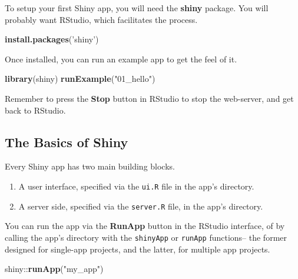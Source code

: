 \documentclass[]{book}
\newenvironment{Shaded}{\begin{snugshade}}{\end{snugshade}}
\newcommand{\KeywordTok}[1]{\textcolor[rgb]{0.13,0.29,0.53}{\textbf{{#1}}}}
\newcommand{\StringTok}[1]{\textcolor[rgb]{0.31,0.60,0.02}{{#1}}}
\newcommand{\NormalTok}[1]{{#1}}
\providecommand{\tightlist}{%
  \setlength{\itemsep}{0pt}\setlength{\parskip}{0pt}}
\theoremstyle{definition}
\theoremstyle{definition}
\theoremstyle{remark}
\begin{document}
To setup your first Shiny app, you will need the \textbf{shiny} package.
You will probably want RStudio, which facilitates the process.

\begin{Shaded}
\begin{Highlighting}[]
\KeywordTok{install.packages}\NormalTok{(}\StringTok{'shiny'}\NormalTok{)}
\end{Highlighting}
\end{Shaded}

Once installed, you can run an example app to get the feel of it.

\begin{Shaded}
\begin{Highlighting}[]
\KeywordTok{library}\NormalTok{(shiny)}
\KeywordTok{runExample}\NormalTok{(}\StringTok{"01_hello"}\NormalTok{)}
\end{Highlighting}
\end{Shaded}

Remember to press the \textbf{Stop} button in RStudio to stop the
web-server, and get back to RStudio.

\subsection{The Basics of Shiny}\label{the-basics-of-shiny}

Every Shiny app has two main building blocks.

\begin{enumerate}
\def\labelenumi{\arabic{enumi}.}
\tightlist
\item
  A user interface, specified via the \texttt{ui.R} file in the app's
  directory.
\item
  A server side, specified via the \texttt{server.R} file, in the app's
  directory.
\end{enumerate}

You can run the app via the \textbf{RunApp} button in the RStudio
interface, of by calling the app's directory with the \texttt{shinyApp}
or \texttt{runApp} functions-- the former designed for single-app
projects, and the latter, for multiple app projects.

\begin{Shaded}
\begin{Highlighting}[]
\NormalTok{shiny::}\KeywordTok{runApp}\NormalTok{(}\StringTok{"my_app"}\NormalTok{)}
\end{Highlighting}
\end{Shaded}
\end{document}
